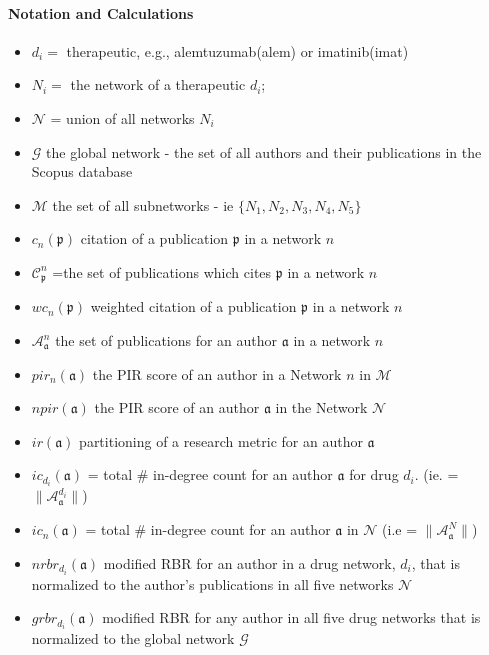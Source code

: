\documentclass[10pt,letterpaper]{article}
\begin{document}
\paragraph*{Notation and Calculations} 
\textbf{}
\begin {itemize}
\item $d_i =$  therapeutic, e.g., alemtuzumab(alem) or imatinib(imat)
\item $N_i =$ the network of a therapeutic $d_i$;
\item $\mathcal{N}$ = union of all networks $N_i$
\item $\mathcal{G}$ the global network - the set of all authors and their publications in the Scopus database
\item $\mathcal{M}$ the set of all subnetworks - ie $\{N_1,N_2,N_3,N_4,N_5\}$
\item $c_n(\mathfrak{p})$ citation of a publication $\mathfrak{p}$ in a network $n$
\item $\mathcal{C}_\mathfrak{p}^n$ =the set of publications which cites $\mathfrak{p}$ in a network $n$
\item $wc_n(\mathfrak{p})$  weighted citation of a publication $\mathfrak{p}$ in a network $n$
\item $\mathcal{A}_\mathfrak{a}^n$ the set of publications for an author $\mathfrak{a}$ in a network $n$
\item $pir_n(\mathfrak{a})$ the PIR  score of an author in a Network $n$ in $\mathcal{M}$
\item $npir(\mathfrak{a})$ the PIR score of an author  $\mathfrak{a}$ in the Network  $\mathcal{N}$ 
\item $ir(\mathfrak{a})$ partitioning of a research metric for an author $\mathfrak{a}$ 
\item $ic_{d_i}(\mathfrak{a})$ = total \# in-degree count for an author $\mathfrak{a}$  for drug $d_i$. (ie. = $\|\mathcal{A}_\mathfrak{a}^{d_i}\|$)
\item $ic_n(\mathfrak{a})$ = total \# in-degree count for an author $\mathfrak{a}$  in  $\mathcal{N}$ (i.e = $\|\mathcal{A}_\mathfrak{a}^{N}\|$)
\item $ nrbr_{d_i}(\mathfrak{a}) $ modified RBR for an author in a drug network, $d_i$, that is normalized to the author's publications in all five networks $\mathcal{N}$ 
\item $ grbr_{d_i}(\mathfrak{a}) $ modified RBR for any author in all five drug networks that is normalized to the global network $\mathcal{G}$ 
\end{itemize}
\vspace{2 mm}
\end{document}
